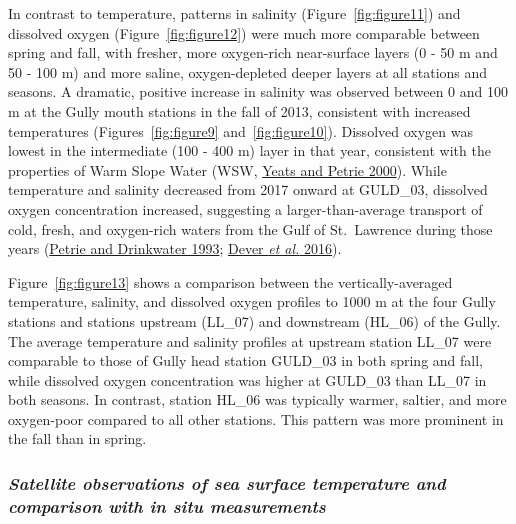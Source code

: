 \documentclass[12pt]{article}\usepackage[]{graphicx}\usepackage[]{color}
\begin{document}
In contrast to temperature, patterns in salinity (Figure~\ref{fig:figure11}) and dissolved oxygen (Figure~\ref{fig:figure12}) were much more comparable between spring and fall, with fresher, more oxygen-rich near-surface layers (0 - 50 m and 50 - 100 m) and more saline, oxygen-depleted deeper layers at all stations and seasons. A dramatic, positive increase in salinity was observed between 0 and 100 m at the Gully mouth stations in the fall of 2013, consistent with increased temperatures (Figures~\ref{fig:figure9} and~\ref{fig:figure10}). Dissolved oxygen was lowest in the intermediate (100 - 400 m) layer in that year, consistent with the properties of Warm Slope Water (WSW, \protect\hyperlink{ref-yeats_2000}{Yeats and Petrie 2000}). While temperature and salinity decreased from 2017 onward at GULD\_03, dissolved oxygen concentration increased, suggesting a larger-than-average transport of cold, fresh, and oxygen-rich waters from the Gulf of St.~Lawrence during those years (\protect\hyperlink{ref-petrie_1993}{Petrie and Drinkwater 1993}; \protect\hyperlink{ref-dever_2016}{Dever \textit{et al.} 2016}).

Figure~\ref{fig:figure13} shows a comparison between the vertically-averaged temperature, salinity, and dissolved oxygen profiles to 1000 m at the four Gully stations and stations upstream (LL\_07) and downstream (HL\_06) of the Gully. The average temperature and salinity profiles at upstream station LL\_07 were comparable to those of Gully head station GULD\_03 in both spring and fall, while dissolved oxygen concentration was higher at GULD\_03 than LL\_07 in both seasons. In contrast, station HL\_06 was typically warmer, saltier, and more oxygen-poor compared to all other stations. This pattern was more prominent in the fall than in spring.

\hypertarget{satellite-observations-of-sea-surface-temperature-and-comparison-with-in-situ-measurements}{%
\subsubsection{\texorpdfstring{\emph{Satellite observations of sea surface temperature and comparison with in situ measurements}}{Satellite observations of sea surface temperature and comparison with in situ measurements}}\label{satellite-observations-of-sea-surface-temperature-and-comparison-with-in-situ-measurements}}
\end{document}
